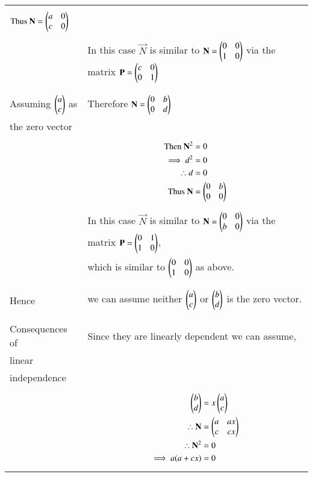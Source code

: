\begin{longtable}{|l|l|}
{\begin{align}
\mbox{Thus }\mathbf{N}&=\begin{pmatrix}a&0\\c&0\end{pmatrix}
\end{align}}\\
&In this case $\vec{N}$ is similar to $\mathbf{N}=\begin{pmatrix}0&0\\1&0\end{pmatrix}$ via the matrix $\mathbf{P}=\begin{pmatrix}c&0\\0&1\end{pmatrix}$\\
&\\
\hline
&\\
Assuming $\begin{pmatrix}a\\c\end{pmatrix}$ as&Therefore
$\mathbf{N}=\begin{pmatrix}0&b\\0&d\end{pmatrix}$\\
the zero vector&\\
&\parbox{6cm}{\begin{align}
\mbox{Then }\mathbf{N}^2&=0\\
\implies d^2&=0\\
\therefore d&=0\\
\mbox{Thus }\mathbf{N}&=\begin{pmatrix}0&b\\0&0\end{pmatrix}
\end{align}}\\
&In this case $\vec{N}$ is similar to $\mathbf{N}=\begin{pmatrix}0&0\\b&0\end{pmatrix}$ via the matrix $\mathbf{P}=\begin{pmatrix}0&1\\1&0\end{pmatrix}$,\\
&which is similar to $\begin{pmatrix}0&0\\1&0\end{pmatrix}$ as above.\\
&\\
\hline
&\\
Hence& we can assume neither $\begin{pmatrix}a\\c\end{pmatrix}$ or $\begin{pmatrix}b\\d\end{pmatrix}$ is the zero vector.\\
&\\
\hline
&\\
Consequences of &Since they are linearly dependent we can assume,\\
linear&\\
independence&\\
&\parbox{6cm}{\begin{align}
\myvec{b\\d}&=x\myvec{a\\c}\\
\therefore \vec{N}&=\myvec{a&ax\\c&cx}\\
\therefore \vec{N}^2&=0\\
\implies a(a+cx)&=0\\

\end{align}}
\end{longtable}
